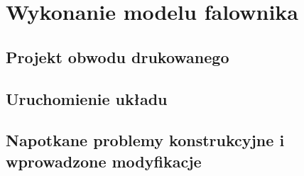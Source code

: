 \chapter{Wykonanie modelu falownika}
\label{chap: Wykonanie modelu falownika}

\section{Projekt obwodu drukowanego}
\label{sec: Projekt obwodu drukowanego}

\section{Uruchomienie układu}
\label{sec: Uruchomienie układu}

\section{Napotkane problemy konstrukcyjne i wprowadzone modyfikacje}
\label{sec: Napotkane problemy konstrukcyjne i wprowadzone modyfikacje}